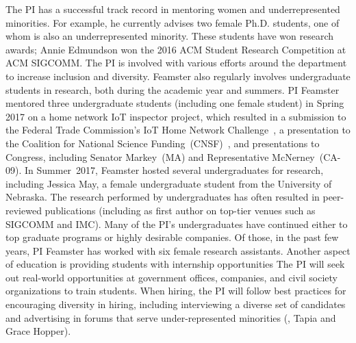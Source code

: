 The PI has a successful track record in mentoring women and underrepresented
minorities. For example, he currently advises two female Ph.D. students, one
of whom is also an underrepresented minority. These students have won research
awards; Annie Edmundson won the 2016 ACM Student Research Competition at ACM
SIGCOMM. The PI is involved with various efforts around the department to
increase inclusion and diversity.  Feamster also regularly involves
undergraduate students in research, both during the academic year and summers.
PI Feamster mentored three undergraduate students (including one female
student) in Spring 2017 on a home network IoT inspector project, which
resulted in a submission to the Federal Trade Commission's IoT Home Network
Challenge~\cite{iot-monitor-ftc}, a presentation to the Coalition for National
Science Funding~(CNSF)~\cite{cnsf2017-iot}, and presentations to Congress,
including Senator Markey~(MA) and Representative McNerney~(CA-09).  In
Summer~2017, Feamster hosted several undergraduates for research, including
Jessica May, a female undergraduate student from the University of Nebraska.
The research performed by undergraduates has often resulted in peer-reviewed
publications (including as first author on top-tier venues such as SIGCOMM and
IMC).  Many of the PI's undergraduates have continued either to top graduate
programs or highly desirable companies. Of those, in the past few years, PI
Feamster has worked with six female research assistants.  Another aspect of
education is providing students with internship opportunities The PI will seek
out real-world opportunities at government offices, companies, and civil
society organizations to train students.  When hiring, the PI will follow best
practices for encouraging diversity in hiring, including interviewing a
diverse set of candidates and advertising in forums that serve
under-represented minorities (\eg, Tapia and Grace Hopper).

